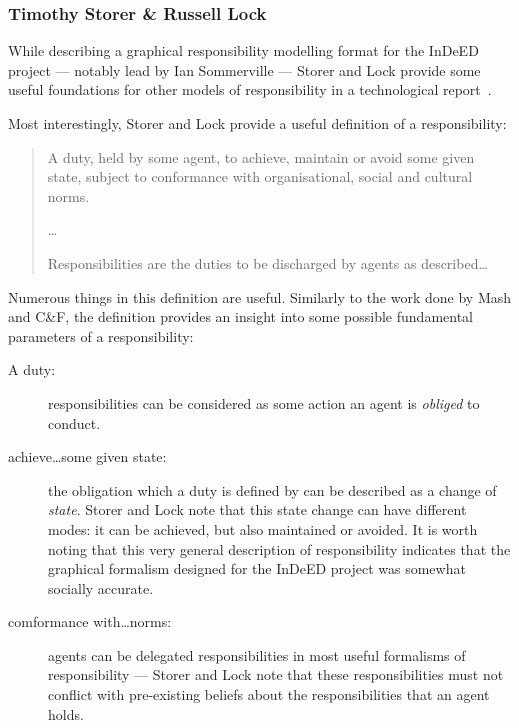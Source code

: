\subsubsection{Timothy Storer \& Russell Lock}
While describing a graphical responsibility modelling format for the InDeED project --- notably lead by Ian Sommerville --- Storer and Lock provide some useful foundations for other models of responsibility in a technological report\cite{storer2008modelling}~.\par

Most interestingly, Storer and Lock provide a useful definition of a responsibility:

\begin{quotation}
    A duty, held by some agent, to achieve, maintain or avoid some given state, subject to conformance with organisational, social and cultural norms.\cite{storer2008modelling}\par
    
    \ldots{}\par
    
    Responsibilities are the duties to be discharged by agents as described\ldots{}
\end{quotation}

Numerous things in this definition are useful. Similarly to the work done by Mash and C\&F, the definition provides an insight into some possible fundamental parameters of a responsibility:

\begin{description}
    \item [A duty: ] responsibilities can be considered as some action an agent is \emph{obliged} to conduct.
    \item [achieve\ldots{}some given state: ] the obligation which a duty is defined by can be described as a change of \emph{state}. Storer and Lock note that this state change can have different modes: it can be achieved, but also maintained or avoided. It is worth noting that this very general description of responsibility indicates that the graphical formalism designed for the InDeED project was somewhat socially accurate.
    \item [comformance with\ldots{}norms: ] agents can be delegated responsibilities in most useful formalisms of responsibility --- Storer and Lock note that these responsibilities must not conflict with pre-existing beliefs about the responsibilities that an agent holds.
\end{description}

